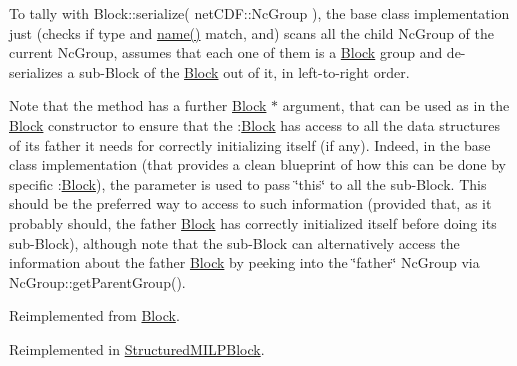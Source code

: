 To tally with Block\+::serialize( net\+C\+D\+F\+::\+Nc\+Group ), the base class implementation just (checks if type and \mbox{\hyperlink{class_s_m_spp__di__unipi__it_1_1_block_a738e9dfd6e00507da219e4bd5a3f6be9}{name()}} match, and) scans all the child Nc\+Group of the current Nc\+Group, assumes that each one of them is a \mbox{\hyperlink{class_s_m_spp__di__unipi__it_1_1_block}{Block}} group and de-\/serializes a sub-\/\+Block of the \mbox{\hyperlink{class_s_m_spp__di__unipi__it_1_1_block}{Block}} out of it, in left-\/to-\/right order.

Note that the method has a further \mbox{\hyperlink{class_s_m_spp__di__unipi__it_1_1_block}{Block}} $\ast$ argument, that can be used as in the \mbox{\hyperlink{class_s_m_spp__di__unipi__it_1_1_block}{Block}} constructor to ensure that the \+:\mbox{\hyperlink{class_s_m_spp__di__unipi__it_1_1_block}{Block}} has access to all the data structures of its father it needs for correctly initializing itself (if any). Indeed, in the base class implementation (that provides a clean blueprint of how this can be done by specific \+:\mbox{\hyperlink{class_s_m_spp__di__unipi__it_1_1_block}{Block}}), the parameter is used to pass \char`\"{}this\char`\"{} to all the sub-\/\+Block. This should be the preferred way to access to such information (provided that, as it probably should, the father \mbox{\hyperlink{class_s_m_spp__di__unipi__it_1_1_block}{Block}} has correctly initialized itself before doing its sub-\/\+Block), although note that the sub-\/\+Block can alternatively access the information about the father \mbox{\hyperlink{class_s_m_spp__di__unipi__it_1_1_block}{Block}} by peeking into the \char`\"{}father\char`\"{} Nc\+Group via Nc\+Group\+::get\+Parent\+Group(). 

Reimplemented from \mbox{\hyperlink{class_s_m_spp__di__unipi__it_1_1_block_a4b98fbc561cffa3e92a2690c831ab3c9}{Block}}.



Reimplemented in \mbox{\hyperlink{class_s_m_spp__di__unipi__it_1_1_structured_m_i_l_p_block_a817e3ce47ea40c14517ec16c6b62b814}{Structured\+M\+I\+L\+P\+Block}}.

\mbox{\label{class_s_m_spp__di__unipi__it_1_1_simple_m_i_l_p_block_a019850055afe817b816bae5699f461d3}} 
